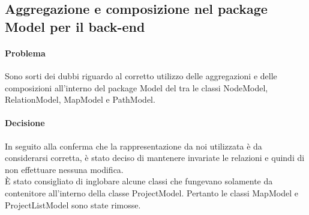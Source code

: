 \subsection{Aggregazione e composizione nel package Model per il back-end}
\paragraph{Problema}
Sono sorti dei dubbi riguardo al corretto utilizzo delle aggregazioni e delle composizioni all'interno del package Model del  tra le classi NodeModel, RelationModel, MapModel e PathModel.
\paragraph{Decisione}
In seguito alla conferma che la rappresentazione da noi utilizzata è da considerarsi corretta, è stato deciso di mantenere invariate le relazioni e quindi di non effettuare nessuna modifica.\\
È stato consigliato di inglobare alcune classi che fungevano solamente da contenitore all'interno della classe ProjectModel. Pertanto le classi MapModel e ProjectListModel sono state rimosse.
